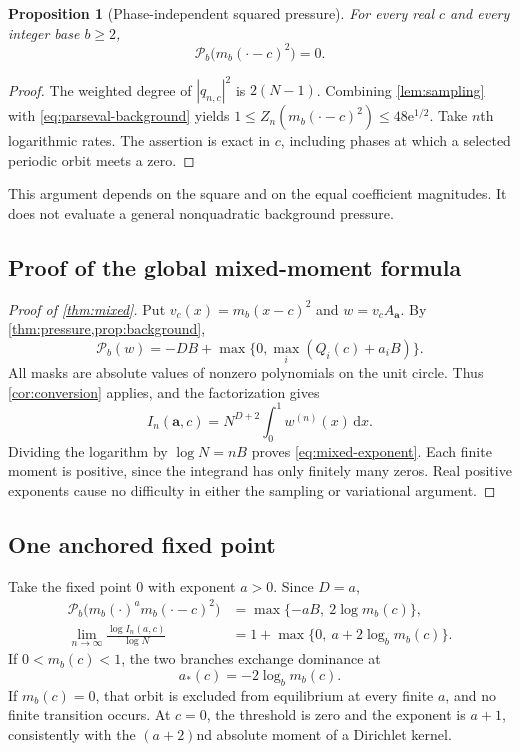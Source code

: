 \documentclass[11pt,a4paper]{article}
\numberwithin{equation}{section}
\newtheorem{proposition}[proposition]{Proposition}\aliascntresetthe{proposition}
\theoremstyle{definition}
\theoremstyle{remark}
\newcommand{\dd}{\,\mathrm d}
\newcommand{\ee}{\mathrm e}
\newcommand{\PP}{\mathcal P}
\begin{document}
\begin{proposition}[Phase-independent squared pressure]
\label{prop:background}
For every real $c$ and every integer base $b\ge2$,
\begin{equation}
 \PP_b\bigl(m_b(\cdot-c)^2\bigr)=0.
 \label{eq:background}
\end{equation}
\end{proposition}
\begin{proof}
The weighted degree of $|q_{n,c}|^2$ is $2(N-1)$.
Combining \cref{lem:sampling} with \cref{eq:parseval-background} yields
$1\le Z_n(m_b(\cdot-c)^2)\le48\ee^{1/2}$. Take $n$th logarithmic
rates. The assertion is exact in $c$, including phases at which a
selected periodic orbit meets a zero.
\end{proof}
This argument depends on the square and on the equal coefficient
magnitudes. It does not evaluate a general nonquadratic background
pressure.

\subsection{Proof of the global mixed-moment formula}
\begin{proof}[Proof of \cref{thm:mixed}]
Put $v_c(x)=m_b(x-c)^2$ and $w=v_cA_{\boldsymbol a}$.
By \cref{thm:pressure,prop:background},
\[
 \PP_b(w)=-DB+\max\{0,\max_i(Q_i(c)+a_iB)\}.
\]
All masks are absolute values of nonzero polynomials on the unit
circle. Thus \cref{cor:conversion} applies, and the factorization gives
\[
 I_n(\boldsymbol a,c)=N^{D+2}\int_0^1w^{(n)}(x)\dd x.
\]
Dividing the logarithm by $\log N=nB$ proves
\cref{eq:mixed-exponent}. Each finite moment is positive, since the
integrand has only finitely many zeros. Real positive exponents cause
no difficulty in either the sampling or variational argument.
\end{proof}

\subsection{One anchored fixed point}
Take the fixed point $0$ with exponent $a>0$. Since $D=a$,
\begin{align}
 \PP_b\bigl(m_b(\cdot)^a m_b(\cdot-c)^2\bigr)
 &=\max\{-aB,\ 2\log m_b(c)\},\label{eq:one-anchor-pressure}\\
 \lim_{n\to\infty}\frac{\log I_n(a,c)}{\log N}
 &=1+\max\{0,\ a+2\log_b m_b(c)\}.
 \label{eq:one-anchor-moment}
\end{align}
If $0<m_b(c)<1$, the two branches exchange dominance at
\begin{equation}
 a_*(c)=-2\log_b m_b(c).
 \label{eq:threshold}
\end{equation}
If $m_b(c)=0$, that orbit is excluded from equilibrium at every finite
$a$, and no finite transition occurs. At $c=0$, the threshold is zero
and the exponent is $a+1$, consistently with the $(a+2)$nd absolute
moment of a Dirichlet kernel.
\end{document}

